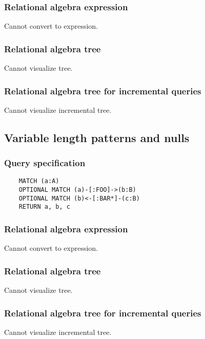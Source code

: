 	\subsubsection*{Relational algebra expression}

	Cannot convert to expression.

	\subsubsection*{Relational algebra tree}

	Cannot visualize tree.

	\subsubsection*{Relational algebra tree for incremental queries}

	Cannot visualize incremental tree.
	\subsection{Variable length patterns and nulls}

	\subsubsection*{Query specification}

	\begin{lstlisting}
	MATCH (a:A)
	OPTIONAL MATCH (a)-[:FOO]->(b:B)
	OPTIONAL MATCH (b)<-[:BAR*]-(c:B)
	RETURN a, b, c
	\end{lstlisting}


	\subsubsection*{Relational algebra expression}

	Cannot convert to expression.

	\subsubsection*{Relational algebra tree}

	Cannot visualize tree.

	\subsubsection*{Relational algebra tree for incremental queries}

	Cannot visualize incremental tree.
